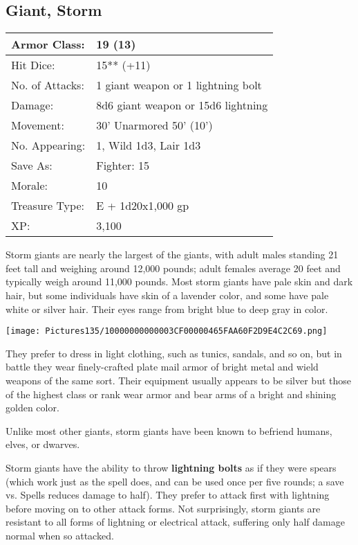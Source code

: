 \documentclass[a4paper,twoside,openany,10pt]{book}
\begin{document}
\begin{multicols}{2}
\subsection*{Giant, Storm}\label{giant-storm}

\begin{tabularx}{0.48\textwidth}{@{}lX@{}}
Armor Class: & 19 (13) \\\hline
Hit Dice: & 15** (+11) \\\hline
No. of Attacks: & 1 giant weapon or 1 lightning bolt \\\hline
Damage: & 8d6 giant weapon or 15d6 lightning \\\hline
Movement: & 30' Unarmored 50'
(10') \\\hline
No. Appearing: & 1, Wild 1d3, Lair 1d3 \\\hline
Save As: & Fighter: 15 \\\hline
Morale: & 10 \\\hline
Treasure Type: & E + 1d20x1,000 gp \\\hline
XP: & 3,100 \\\hline
\end{tabularx}\medskip

Storm giants are nearly the largest of the giants, with adult males standing 21 feet tall and weighing around 12,000 pounds; adult females average 20 feet and typically weigh around 11,000 pounds. Most storm giants have pale skin and dark hair, but some individuals have skin of a lavender color, and some have pale white or silver hair. Their eyes range from bright blue to deep gray in color.

\begin{center}
	\texttt{[image: Pictures135/10000000000003CF00000465FAA60F2D9E4C2C69.png]}
\end{center}

They prefer to dress in light clothing, such as tunics, sandals, and so on, but in battle they wear finely-crafted plate mail armor of bright metal and wield weapons of the same sort. Their equipment usually appears to be silver but those of the highest class or rank wear armor and bear arms of a bright and shining golden color.

Unlike most other giants, storm giants have been known to befriend humans, elves, or dwarves.

Storm giants have the ability to throw \textbf{lightning bolts} as if they were spears (which work just as the spell does, and can be used once per five rounds; a save vs. Spells reduces damage to half). They prefer to attack first with lightning before moving on to other attack forms. Not surprisingly, storm giants are resistant to all forms of lightning or electrical attack, suffering only half damage normal when so attacked.


\end{multicols}
\end{document}
